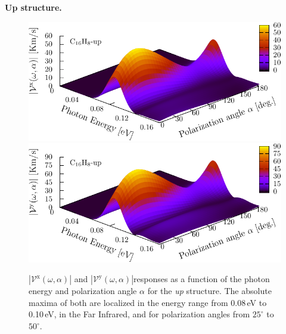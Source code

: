 \documentclass[prb,11pt,tightenlines,twocolumn,aps]{revtex4-1}
\begin{document}
\textbf{Up structure.}
\begin{figure}[t]
    \centering
    \includegraphics[width=\linewidth]{upplots/up-3d-vxb-1}
    \\
    \includegraphics[width=\linewidth]{upplots/up-3d-vyb-1}
    
    \caption{ $|\mathcal{V}^{\mathrm{x}}(\omega,\alpha)|$ and
    $|\mathcal{V}^{\mathrm{y}}(\omega,\alpha)|$responses as a function of the
    photon energy and polarization angle $\alpha$ for the \emph{up} structure.
    The absolute maxima of both are localized in the energy range from 0.08\,eV
    to 0.10\,eV, in the Far  Infrared, and for polarization angles from
    $25^{\circ}$ to $50^{\circ}$.}
    \label{fig:up-3d-vva-1}
\end{figure}
\end{document}

